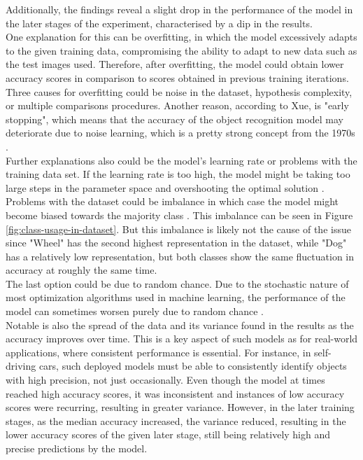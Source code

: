 
Additionally, the findings reveal a slight drop in the performance of the model in the later stages of the experiment, 
characterised by a dip in the results.\\
One explanation for this can be overfitting, in which the model excessively adapts to the given training data, compromising the ability to 
adapt to new data such as the test images used. Therefore, after overfitting, the model could obtain lower accuracy scores in comparison 
to scores obtained in previous training iterations. Three causes for overfitting could be noise in the dataset, 
hypothesis complexity, or multiple comparisons procedures. Another reason, according to Xue, is "early stopping",
which means that the accuracy of the object recognition model may deteriorate due to noise learning,
which is a pretty strong concept from the 1970s \parencite[1--2]{Xue2019}.\\
Further explanations also could be the model's learning rate or problems with the training data set. If the learning rate is too high, the
model might be taking too large steps in the parameter space and overshooting the optimal solution \cite{GreatLearningTeam2020}.
Problems with the dataset could be imbalance in which case the model might become biased towards the majority class \parencite{Brownlee2019a} . 
This imbalance can be seen in Figure \ref{fig:class-usage-in-dataset}. But this imbalance is likely not the cause of the issue since 
"Wheel" has the second highest representation in the dataset, while "Dog" has a relatively low representation, but both classes show the same 
fluctuation in accuracy at roughly the same time.\\
The last option could be due to random chance. Due to the stochastic nature of most optimization algorithms used in machine 
learning, the performance of the model can sometimes worsen purely due to random chance \parencite{Brownlee2021}.\\


Notable is also the spread of the data and its variance found in the results as the accuracy improves over time. This is a key aspect of such models as for real-world applications, where consistent performance is essential. For instance, in self-driving cars, such deployed models must be able to consistently identify objects with high precision, not just occasionally. Even though the model at times reached high accuracy scores, it was inconsistent and instances of low accuracy scores were recurring, resulting in greater variance. However, in the later training stages,  as the median accuracy increased, the variance reduced, resulting in the lower accuracy scores of the given later stage, still being relatively high and precise predictions by the model.   \\

